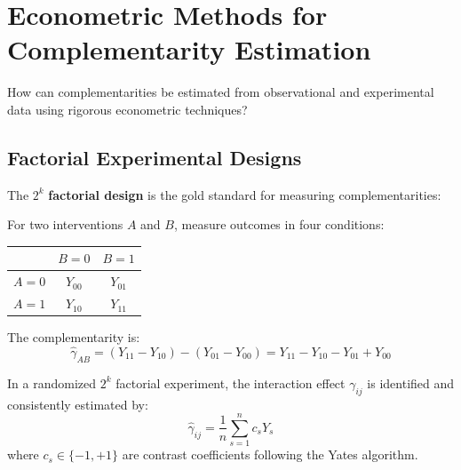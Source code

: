 \section{Econometric Methods for Complementarity Estimation}
\label{sec:econometric-methods}

\begin{tcolorbox}[colback=green!5!white,colframe=green!75!black,title=\textbf{Fundamental Question}]
How can complementarities be estimated from observational and experimental data using rigorous econometric techniques?
\end{tcolorbox}

\subsection{Factorial Experimental Designs}
\label{subsec:factorial-designs}

The $2^k$ \textbf{factorial design} is the gold standard for measuring complementarities:

\begin{definition}
For two interventions $A$ and $B$, measure outcomes in four conditions:
\begin{center}
\begin{tabular}{c|cc}
& $B = 0$ & $B = 1$ \\
\hline
$A = 0$ & $Y_{00}$ & $Y_{01}$ \\
$A = 1$ & $Y_{10}$ & $Y_{11}$
\end{tabular}
\end{center}
The complementarity is:
\begin{equation}
\hat{\gamma}_{AB} = (Y_{11} - Y_{10}) - (Y_{01} - Y_{00}) = Y_{11} - Y_{10} - Y_{01} + Y_{00}
\label{eq:factorial-gamma}
\end{equation}
\end{definition}

\begin{theorem}
In a randomized $2^k$ factorial experiment, the interaction effect $\gamma_{ij}$ is identified and consistently estimated by:
\begin{equation}
\hat{\gamma}_{ij} = \frac{1}{n} \sum_{s=1}^{n} c_s Y_s
\end{equation}
where $c_s \in \{-1, +1\}$ are contrast coefficients following the Yates algorithm.
\end{theorem}

